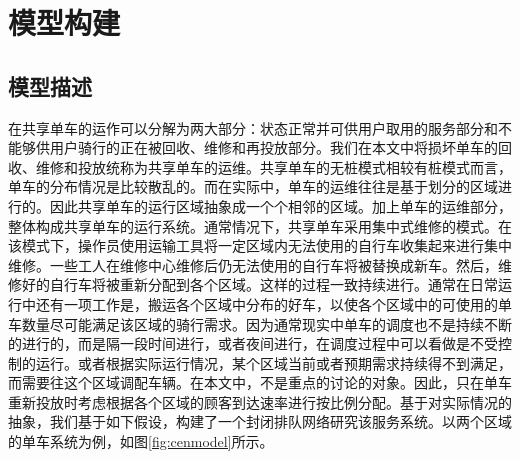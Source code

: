 \documentclass{article}
\begin{document}



\section{模型构建}
\subsection{模型描述}
在共享单车的运作可以分解为两大部分：状态正常并可供用户取用的服务部分和不能够供用户骑行的正在被回收、维修和再投放部分。我们在本文中将损坏单车的回收、维修和投放统称为共享单车的运维。共享单车的无桩模式相较有桩模式而言，单车的分布情况是比较散乱的。而在实际中，单车的运维往往是基于划分的区域进行的。因此共享单车的运行区域抽象成一个个相邻的区域。加上单车的运维部分，整体构成共享单车的运行系统。通常情况下，共享单车采用集中式维修的模式。在该模式下，操作员使用运输工具将一定区域内无法使用的自行车收集起来进行集中维修。一些工人在维修中心维修后仍无法使用的自行车将被替换成新车。然后，维修好的自行车将被重新分配到各个区域。这样的过程一致持续进行。通常在日常运行中还有一项工作是，搬运各个区域中分布的好车，以使各个区域中的可使用的单车数量尽可能满足该区域的骑行需求。因为通常现实中单车的调度也不是持续不断的进行的，而是隔一段时间进行，或者夜间进行，在调度过程中可以看做是不受控制的运行。或者根据实际运行情况，某个区域当前或者预期需求持续得不到满足，而需要往这个区域调配车辆。在本文中，不是重点的讨论的对象。因此，只在单车重新投放时考虑根据各个区域的顾客到达速率进行按比例分配。基于对实际情况的抽象，我们基于如下假设，构建了一个封闭排队网络研究该服务系统。以两个区域的单车系统为例，如图\ref{fig:cenmodel}所示。
\end{document}

